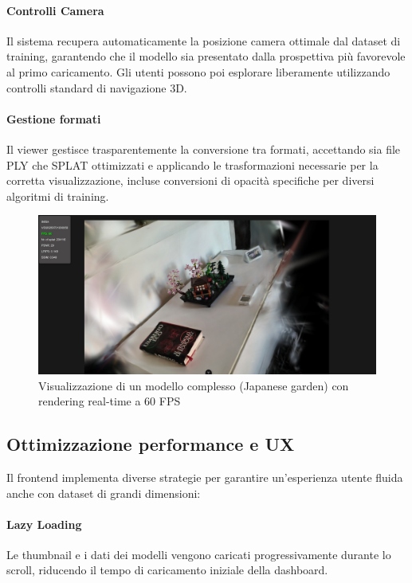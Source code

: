 \paragraph{Controlli Camera}
Il sistema recupera automaticamente la posizione camera ottimale dal dataset di training, garantendo che il modello sia presentato dalla prospettiva più favorevole al primo caricamento. Gli utenti possono poi esplorare liberamente utilizzando controlli standard di navigazione 3D.

\paragraph{Gestione formati}
Il viewer gestisce trasparentemente la conversione tra formati, accettando sia file PLY che SPLAT ottimizzati e applicando le trasformazioni necessarie per la corretta visualizzazione, incluse conversioni di opacità specifiche per diversi algoritmi di training.

\begin{figure}[htbp]
	\centering
	\includegraphics[width=\textwidth]{images/frontend_viewer_3.jpg}
	\caption{Visualizzazione di un modello complesso (Japanese garden) con rendering real-time a 60 FPS}
	\label{fig:viewer3d_complex}
\end{figure}
\newpage
\subsection{Ottimizzazione performance e UX}

Il frontend implementa diverse strategie per garantire un'esperienza utente fluida anche con dataset di grandi dimensioni:

\paragraph{Lazy Loading}
Le thumbnail e i dati dei modelli vengono caricati progressivamente durante lo scroll, riducendo il tempo di caricamento iniziale della dashboard.

